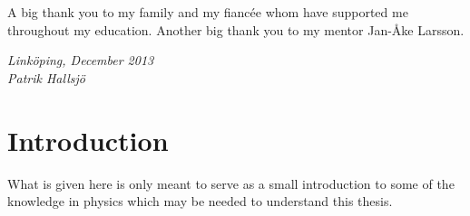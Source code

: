 \documentclass[
  utf8,%
  parskip,%
  largesmallcaps,intlimits,widermath,%
  sharecounter,nobreak,definition=marks,%
  noparts%
]{rtthesis}
\begin{document}
\makeFrontPage
\frontmatter
\maketitle

\begin{abstract}[english]
  In this Bachelor’s thesis the following question is answered: Does the
inequality posed in the article Klyachko et al [2008] cover the real
part of the Bloch surface of a 3D quantum system when used as in Kochen
and Specker [1967]? The Klyachko inequality relies on using five
measurements to show contextuality of a subset of states on the real
part of the Bloch surface. These can now be used in several
configurations as present in the Kochen-Specker contextuality proof, by
simply rotating the measurements. We show here that these new
inequalities will have subsets of violation that eventually cover the
entire real part of the Bloch surface. This can be extended to show that
all states of a spin 1 system are non-contextual, so that we have
recovered a state-independent contextuality proof by using the Klyachko
inequality several times. In the final part, an interpretation of this is
given and also some recommendations for further research that should be
done in the field.
\end{abstract}

\begin{acknowledgments}
A big thank you to my family and my fiancée whom have supported me throughout my education.
Another big thank you to my mentor Jan-Åke Larsson.

  \addvspace{1em}
  \begin{flushright}
    \textit{%
      Linköping, December 2013\\
      Patrik Hallsjö%
    }
  \end{flushright}
\end{acknowledgments}

\tableofcontents
%
\mainmatter
\chapter{Introduction}\label{cha:intro}
What is given here is only meant to serve as a small introduction to some of the knowledge in physics which may be needed to understand this thesis.    
\newpage
\end{document}
